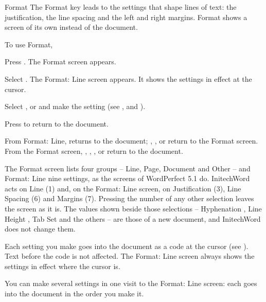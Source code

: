 \begin{Feature}{Format}
The Format key leads to the settings that shape lines of text: the
justification, the line spacing and the left and right margins.  Format
shows a screen of its own instead of the document.

To use Format,
\begin{WPSteps}
\item Press .  The Format screen appears.
\item Select .  The Format: Line screen appears.  It shows the
settings in effect at the cursor.
\item Select ,  or
 and make the setting (see ,
 and ).
\item Press  to return to the document.
\end{WPSteps}

\Notes
{}
From Format: Line,  returns to the document; , ,
 or  return to the Format screen.  From the Format screen,
, , ,  or  return to the document.

The Format screen lists four groups -- Line, Page, Document and Other --
and Format: Line nine settings, as the screens of WordPerfect 5.1 do.
InitechWord acts on Line (1) and, on the Format: Line screen, on
Justification (3), Line Spacing (6) and Margins (7).  Pressing the number of
any other selection leaves the screen as it is.  The values shown beside
those selections -- Hyphenation , Line Height , Tab Set
 and the others -- are those of a new document,
and InitechWord does not change them.

Each setting you make goes into the document as a code at the cursor (see
).  Text before the code is not affected.  The Format: Line
screen always shows the settings in effect where the cursor is.

You can make several settings in one visit to the Format: Line screen:
each goes into the document in the order you make it.

\end{Feature}
